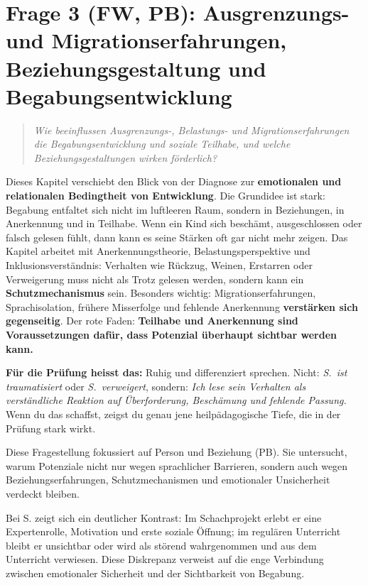 \documentclass[ngerman, a4paper]{article}
\begin{document}
\newpage
\section{Frage 3 (FW, PB): Ausgrenzungs- und Migrationserfahrungen,
  Beziehungsgestaltung und Begabungsentwicklung}
\label{sec:frage3}
 
\begin{quote}\itshape
Wie beeinflussen Ausgrenzungs-, Belastungs- und Migrationserfahrungen die
Begabungsentwicklung und soziale Teilhabe, und welche Beziehungsgestaltungen
wirken förderlich?
\end{quote}

\begin{kapitelueberblick}
Dieses Kapitel verschiebt den Blick von der Diagnose zur \textbf{emotionalen und relationalen Bedingtheit von Entwicklung}. Die Grundidee ist stark: Begabung entfaltet sich nicht im luftleeren Raum, sondern in Beziehungen, in Anerkennung und in Teilhabe. Wenn ein Kind sich beschämt, ausgeschlossen oder falsch gelesen fühlt, dann kann es seine Stärken oft gar nicht mehr zeigen. Das Kapitel arbeitet mit Anerkennungstheorie, Belastungsperspektive und Inklusionsverständnis: Verhalten wie Rückzug, Weinen, Erstarren oder Verweigerung muss nicht als Trotz gelesen werden, sondern kann ein \textbf{Schutzmechanismus} sein. Besonders wichtig: Migrationserfahrungen, Sprachisolation, frühere Misserfolge und fehlende Anerkennung \textbf{verstärken sich gegenseitig}. Der rote Faden: \textbf{Teilhabe und Anerkennung sind Voraussetzungen dafür, dass Potenzial überhaupt sichtbar werden kann.}

\medskip\textbf{Für die Prüfung heisst das:} Ruhig und differenziert sprechen. Nicht: \textit{S.\ ist traumatisiert} oder \textit{S.\ verweigert}, sondern: \textit{Ich lese sein Verhalten als verständliche Reaktion auf Überforderung, Beschämung und fehlende Passung.} Wenn du das schaffst, zeigst du genau jene heilpädagogische Tiefe, die in der Prüfung stark wirkt.
\end{kapitelueberblick}
 
Diese Fragestellung fokussiert auf Person und Beziehung (PB). Sie untersucht, warum
Potenziale nicht nur wegen sprachlicher Barrieren, sondern auch wegen
Beziehungserfahrungen, Schutzmechanismen und emotionaler Unsicherheit verdeckt bleiben.
 
Bei S. zeigt sich ein deutlicher Kontrast: Im Schachprojekt erlebt er eine Expertenrolle,
Motivation und erste soziale Öffnung; im regulären Unterricht bleibt er unsichtbar oder
wird als störend wahrgenommen und aus dem Unterricht verwiesen. Diese Diskrepanz
verweist auf die enge Verbindung zwischen emotionaler Sicherheit und der Sichtbarkeit
von Begabung.
 
\end{document}
